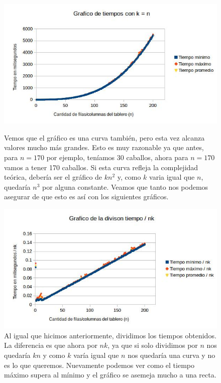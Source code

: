 \documentclass[a4paper]{article}
\begin{document}
\begin{figure}[h!]
\centering
\includegraphics[width=\textwidth]{conjBcurva.jpg}\caption{Vemos que el gráfico es una curva también, pero esta vez alcanza valores mucho más grandes. Esto es muy razonable ya que antes, para $n = 170$ por ejemplo, teníamos 30 caballos, ahora para $n = 170$ vamos a tener 170 caballos. Si esta curva refleja la complejidad teórica, debería ser el gráfico de $kn^2$ y, como $k$ varia igual que $n$, quedaría $n^3$ por alguna constante. Veamos que tanto nos podemos asegurar de que esto es así con los siguientes gráficos.}
\centering
\includegraphics[width=\textwidth]{conjBlinea.jpg}\caption{Al igual que hicimos anteriormente, dividimos los tiempos obtenidos. La diferencia es que ahora por $nk$, ya que si solo dividimos por $n$ nos quedaría $kn$ y como $k$ varía igual que $n$ nos quedaría una curva y no es lo que queremos. Nuevamente podemos ver como el tiempo máximo supera al mínimo y el gráfico se asemeja mucho a una recta.}
\end{figure}
\pagebreak
\newpage
\end{document}
